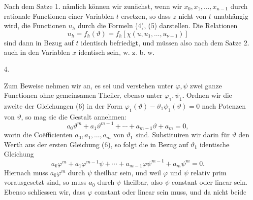 
Nach dem Satze 1. nämlich können wir zunächst, wenn wir
$x_0, x_1, \ldots, x_{n-1}$ durch rationale Functionen einer Variablen $t$
ersetzen, so dass $z$ nicht von $t$ unabhängig wird, die Functionen
$u_h$ durch die Formeln (4), (5) darstellen. Die Relationen
\[
u_h = f_h(\vartheta) = f_h[\chi(u, u_1, \ldots, u_{\nu-1})]
\]
sind dann in Bezug auf $t$ identisch befriedigt, und müssen also
nach dem Satze 2. auch in den Variablen $x$ identisch sein,
w. z. b. w.

4.~

Zum Beweise nehmen wir an, es sei
und verstehen unter $\varphi, \psi$ zwei ganze Functionen ohne gemeinsamen
 Theiler, ebenso unter $\varphi_1, \psi_1$. Ordnen wir die zweite der
Gleichungen (6) in der Form $\varphi_1(\vartheta) - \vartheta_1\psi_1(\vartheta) = 0$ nach Potenzen
 von $\vartheta$, so mag sie die Gestalt annehmen:
\[
a_0\vartheta^m + a_1\vartheta^{m-1} + \cdots + a_{m-1}\vartheta + a_m = 0,
\]
worin die Coëfficienten $a_0, a_1, \ldots, a_m$ 
 von $\vartheta_1$ sind. Substituiren wir darin für $\vartheta$ den Werth
aus der ersten Gleichung (6), so folgt die in Bezug auf $\vartheta_1$ identische
 Gleichung
\[
a_0\varphi^m + a_1\varphi^{m-1}\psi + \cdots + a_{m-1}\varphi\psi^{m-1} + a_m\psi^m = 0.
\]
Hiernach muss $a_0\varphi^m$ durch $\psi$ theilbar sein, und weil $\varphi$
und $\psi$ relativ prim vorausgesetzt sind, so muss $a_0$ durch $\psi$
theilbar, also $\psi$ constant oder linear sein. Ebenso schliessen
wir, dass $\varphi$ constant oder linear sein muss, und da nicht beide
